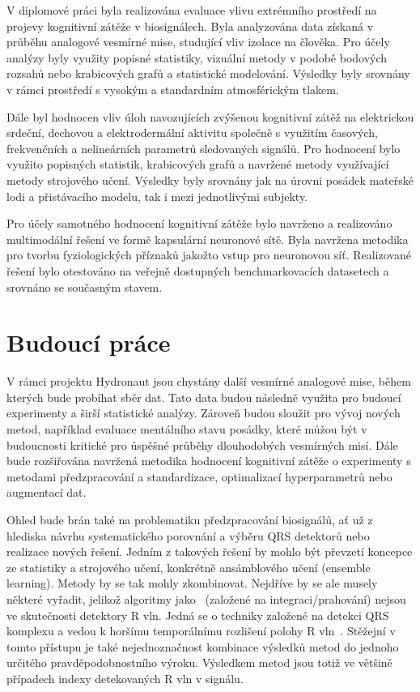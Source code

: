 V diplomové práci byla realizována evaluace vlivu extrémního prostředí na
projevy kognitivní zátěže v biosignálech. Byla analyzována data získaná v
průběhu analogové vesmírné mise, studující vliv izolace na člověka. Pro účely
analýzy byly využity popisné statistiky, vizuální metody v podobě bodových
rozsahů nebo krabicových grafů a statistické modelování. Výsledky byly srovnány
v rámci prostředí s vysokým a standardním atmosférickým tlakem. 

Dále byl hodnocen vliv úloh navozujících zvýšenou kognitivní zátěž na
elektrickou srdeční, dechovou a elektrodermální aktivitu společně s využitím
časových, frekvenčních a nelineárních parametrů sledovaných signálů. Pro
hodnocení bylo využito popisných statistik, krabicových grafů a navržené metody
využívající metody strojového učení. Výsledky byly srovnány jak na úrovni
posádek mateřské lodi a přistávacího modelu, tak i mezi jednotlivými subjekty.

Pro účely samotného hodnocení kognitivní zátěže bylo navrženo a realizováno
multimodální řešení ve formě kapsulární neuronové sítě. Byla navržena metodika
pro tvorbu fyziologických příznaků jakožto vstup pro neuronovou síť. Realizované
řešení bylo otestováno na veřejně dostupných benchmarkovacích datasetech a
srovnáno se současným stavem. 

\section{Budoucí práce}
V rámci projektu Hydronaut jsou chystány další vesmírné analogové mise, během
kterých bude probíhat sběr dat. Tato data budou následně využita pro budoucí
experimenty a širší statistické analýzy. Zároveň budou sloužit pro vývoj nových
metod, například evaluace mentálního stavu posádky, které můžou být v
budoucnosti kritické pro úspěšné průběhy dlouhodobých vesmírných misí. Dále bude
rozšiřována navržená metodika hodnocení kognitivní zátěže o experimenty s
metodami předzpracování a standardizace, optimalizací hyperparametrů nebo
augmentací dat. 

Ohled bude brán také na problematiku předzpracování biosignálů, ať už z hlediska
návrhu systematického porovnání a výběru QRS detektorů nebo realizace nových
řešení. Jedním z takových řešení by mohlo být převzetí koncepce ze statistiky a
strojového učení, konkrétně ansámblového učení (ensemble learning). Metody by se
tak mohly zkombinovat. Nejdříve by se ale musely některé vyřadit, jelikož
algoritmy jako~\cite{Tompkins1985,Christov2004} (založené na
integraci/prahování) nejsou ve skutečnosti detektory R vln. Jedná se o techniky
založené na detekci QRS komplexu a vedou k horšímu temporálnímu rozlišení polohy
R vln~\cite{Porr2019}. Stěžejní v tomto přístupu je také nejednoznačnost
kombinace výsledků metod do jednoho určitého pravděpodobnostního výroku.
Výsledkem metod jsou totiž ve většině případech indexy detekovaných R vln v
signálu. 

